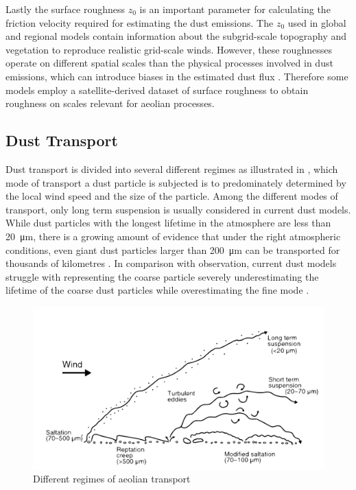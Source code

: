 Lastly the surface roughness $z_0$ is an important parameter for calculating the friction velocity required for estimating the dust emissions. The $z_0$ used in global and regional models contain information about the subgrid-scale topography and vegetation to reproduce realistic grid-scale winds. However, these roughnesses operate on different spatial scales than the physical processes involved in dust emissions, which can introduce biases in the estimated dust flux \parencite{darmenova_development_2009}. Therefore some models employ a satellite-derived dataset of surface roughness to obtain roughness on scales relevant for aeolian processes. 


\subsection{Dust Transport}
Dust transport is divided into several different regimes as illustrated in , which mode of transport a dust particle is subjected is to predominately determined by the local wind speed and the size of the particle. Among the different modes of transport, only long term suspension is usually considered in current dust models.
While dust particles with the longest lifetime in the atmosphere are less than \SI{20}{\micro\metre}, there is a growing amount of evidence that under the right atmospheric conditions, even giant dust particles larger than \SI{200}{\micro\metre} can be transported for thousands of kilometres \parencite{van2018mysterious}. 
In comparison with observation, current dust models struggle with representing the coarse particle severely underestimating the lifetime of the coarse dust particles while overestimating the fine mode \parencite{adebiyi2020dust}. 
\begin{figure}[htbp]
  \centering
  \includegraphics[draft=false,width = \textwidth]{texfiles/figs/aeolian_transport_Parsons_Abrahams.pdf}
  \caption{Different regimes of aeolian transport \parencite{nickling2009aeolian}}
  \label{fig:modes_of_dust_transport}
\end{figure}

